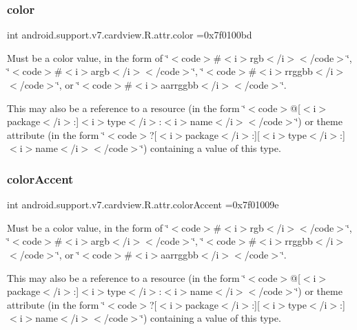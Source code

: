 \subsubsection{\texorpdfstring{color}{color}}
{\footnotesize\ttfamily int android.\+support.\+v7.\+cardview.\+R.\+attr.\+color =0x7f0100bd\hspace{0.3cm}{\ttfamily [static]}}

Must be a color value, in the form of \char`\"{}$<$code$>$\#$<$i$>$rgb$<$/i$>$$<$/code$>$\char`\"{}, \char`\"{}$<$code$>$\#$<$i$>$argb$<$/i$>$$<$/code$>$\char`\"{}, \char`\"{}$<$code$>$\#$<$i$>$rrggbb$<$/i$>$$<$/code$>$\char`\"{}, or \char`\"{}$<$code$>$\#$<$i$>$aarrggbb$<$/i$>$$<$/code$>$\char`\"{}. 

This may also be a reference to a resource (in the form \char`\"{}$<$code$>$@\mbox{[}$<$i$>$package$<$/i$>$\+:\mbox{]}$<$i$>$type$<$/i$>$\+:$<$i$>$name$<$/i$>$$<$/code$>$\char`\"{}) or theme attribute (in the form \char`\"{}$<$code$>$?\mbox{[}$<$i$>$package$<$/i$>$\+:\mbox{]}\mbox{[}$<$i$>$type$<$/i$>$\+:\mbox{]}$<$i$>$name$<$/i$>$$<$/code$>$\char`\"{}) containing a value of this type. \mbox{\label{classandroid_1_1support_1_1v7_1_1cardview_1_1R_1_1attr_ae4b67ff4722615a50ba854b46c49d044}} 
\subsubsection{\texorpdfstring{color\+Accent}{colorAccent}}
{\footnotesize\ttfamily int android.\+support.\+v7.\+cardview.\+R.\+attr.\+color\+Accent =0x7f01009e\hspace{0.3cm}{\ttfamily [static]}}

Must be a color value, in the form of \char`\"{}$<$code$>$\#$<$i$>$rgb$<$/i$>$$<$/code$>$\char`\"{}, \char`\"{}$<$code$>$\#$<$i$>$argb$<$/i$>$$<$/code$>$\char`\"{}, \char`\"{}$<$code$>$\#$<$i$>$rrggbb$<$/i$>$$<$/code$>$\char`\"{}, or \char`\"{}$<$code$>$\#$<$i$>$aarrggbb$<$/i$>$$<$/code$>$\char`\"{}. 

This may also be a reference to a resource (in the form \char`\"{}$<$code$>$@\mbox{[}$<$i$>$package$<$/i$>$\+:\mbox{]}$<$i$>$type$<$/i$>$\+:$<$i$>$name$<$/i$>$$<$/code$>$\char`\"{}) or theme attribute (in the form \char`\"{}$<$code$>$?\mbox{[}$<$i$>$package$<$/i$>$\+:\mbox{]}\mbox{[}$<$i$>$type$<$/i$>$\+:\mbox{]}$<$i$>$name$<$/i$>$$<$/code$>$\char`\"{}) containing a value of this type. \mbox{\label{classandroid_1_1support_1_1v7_1_1cardview_1_1R_1_1attr_a790b4cbf7f9e74effc8b0f61310c0572}} 
